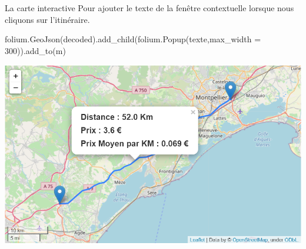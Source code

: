 \documentclass[aspectratio=169]{beamer}
\begin{document}
\begin{frame}{La carte interactive}
Pour ajouter le texte de la fenêtre contextuelle lorsque nous cliquons sur l’itinéraire.

 \begin{block}{}
  {\color{blue} folium.GeoJson(decoded).add\_child(folium.Popup(texte,max\_width = 300)).add\_to(m)} 
 \end{block} 

\begin{center}
 \includegraphics[scale=0.5]{Carte_prix_dist.png}
\end{center}
\end{frame}
\end{document}
